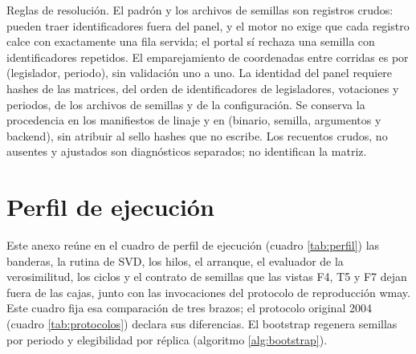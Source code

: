 Reglas de resolución. El padrón y los archivos de semillas son registros crudos: pueden traer
identificadores fuera del panel, y el motor no exige que cada registro calce con exactamente
una fila servida; el portal sí rechaza una semilla con identificadores repetidos. El
emparejamiento de coordenadas entre corridas es por (legislador, periodo), sin validación uno
a uno. La identidad del panel requiere hashes de las matrices, del orden de identificadores
de legisladores, votaciones y periodos, de los archivos de semillas y de la configuración.
Se conserva la procedencia en los manifiestos de linaje y en 
(binario, semilla, argumentos y backend), sin atribuir al sello hashes que no escribe.
Los recuentos crudos, no ausentes y ajustados son diagnósticos separados; no identifican la matriz.

\chapter{Perfil de ejecución}
\label{anexo:perfil}

Este anexo reúne en el cuadro de perfil de ejecución (cuadro \ref{tab:perfil}) las banderas,
la rutina de SVD, los hilos, el arranque, el evaluador de la verosimilitud, los ciclos y el
contrato de semillas que las vistas F4, T5 y F7 dejan fuera de las cajas, junto con las
invocaciones del protocolo de reproducción wmay. Este cuadro fija esa comparación de tres
brazos; el protocolo original 2004 (cuadro \ref{tab:protocolos}) declara sus diferencias.
El bootstrap regenera semillas por periodo y elegibilidad por réplica (algoritmo \ref{alg:bootstrap}).

